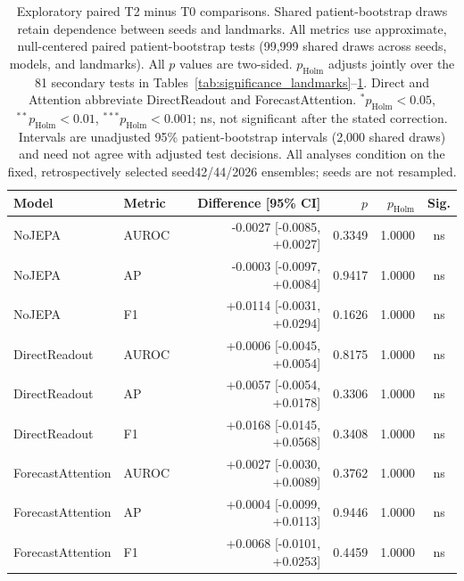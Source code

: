 \begin{table}[t]
\centering
\small
\caption{Exploratory paired T2 minus T0 comparisons. Shared patient-bootstrap draws retain dependence between seeds and landmarks. All metrics use approximate, null-centered paired patient-bootstrap tests (99,999 shared draws across seeds, models, and landmarks). All $p$ values are two-sided. $p_{\mathrm{Holm}}$ adjusts jointly over the 81 secondary tests in Tables~\ref{tab:significance_landmarks}--\ref{tab:significance_longitudinal}. Direct and Attention abbreviate DirectReadout and ForecastAttention. $^{*}p_{\mathrm{Holm}}<0.05$, $^{**}p_{\mathrm{Holm}}<0.01$, $^{***}p_{\mathrm{Holm}}<0.001$; ns, not significant after the stated correction. Intervals are unadjusted 95\% patient-bootstrap intervals (2,000 shared draws) and need not agree with adjusted test decisions. All analyses condition on the fixed, retrospectively selected seed42/44/2026 ensembles; seeds are not resampled.}
\label{tab:significance_longitudinal}
\begin{tabular}{llrrrc}
\toprule
Model & Metric & Difference [95\% CI] & $p$ & $p_{\mathrm{Holm}}$ & Sig. \\
\midrule
NoJEPA & AUROC & -0.0027 [-0.0085, +0.0027] & 0.3349 & 1.0000 & ns \\
NoJEPA & AP & -0.0003 [-0.0097, +0.0084] & 0.9417 & 1.0000 & ns \\
NoJEPA & F1 & +0.0114 [-0.0031, +0.0294] & 0.1626 & 1.0000 & ns \\
DirectReadout & AUROC & +0.0006 [-0.0045, +0.0054] & 0.8175 & 1.0000 & ns \\
DirectReadout & AP & +0.0057 [-0.0054, +0.0178] & 0.3306 & 1.0000 & ns \\
DirectReadout & F1 & +0.0168 [-0.0145, +0.0568] & 0.3408 & 1.0000 & ns \\
ForecastAttention & AUROC & +0.0027 [-0.0030, +0.0089] & 0.3762 & 1.0000 & ns \\
ForecastAttention & AP & +0.0004 [-0.0099, +0.0113] & 0.9446 & 1.0000 & ns \\
ForecastAttention & F1 & +0.0068 [-0.0101, +0.0253] & 0.4459 & 1.0000 & ns \\
\bottomrule
\end{tabular}
\end{table}
